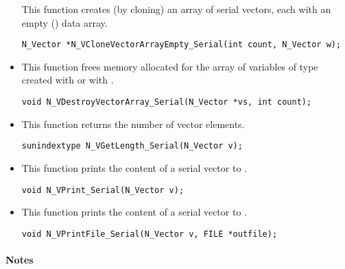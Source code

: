 \begin{itemize}
 This function creates (by cloning) an array of  serial vectors, each with an
 empty () data array.

 

 \verb|N_Vector *N_VCloneVectorArrayEmpty_Serial(int count, N_Vector w);|


\item {}

 This function frees memory allocated for the array of  variables of type
  created with  or with
 .

 

 \verb|void N_VDestroyVectorArray_Serial(N_Vector *vs, int count);|


\item {}

 This function returns the number of vector elements.

 
 
 \verb|sunindextype N_VGetLength_Serial(N_Vector v);|


\item {}

 This function prints the content of a serial vector to .
 
 \verb|void N_VPrint_Serial(N_Vector v);|


\item {}

 This function prints the content of a serial vector to .
 
 \verb|void N_VPrintFile_Serial(N_Vector v, FILE *outfile);|

\end{itemize}
\paragraph{\bf Notes}                                                      
           
